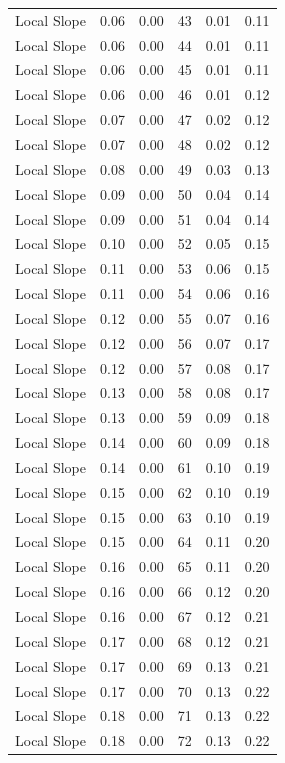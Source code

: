 \documentclass[
]{article}
\begin{document}
\begin{longtable}[]{@{}lrrrrr@{}}
Local Slope & 0.06 & 0.00 & 43 & 0.01 & 0.11 \\
Local Slope & 0.06 & 0.00 & 44 & 0.01 & 0.11 \\
Local Slope & 0.06 & 0.00 & 45 & 0.01 & 0.11 \\
Local Slope & 0.06 & 0.00 & 46 & 0.01 & 0.12 \\
Local Slope & 0.07 & 0.00 & 47 & 0.02 & 0.12 \\
Local Slope & 0.07 & 0.00 & 48 & 0.02 & 0.12 \\
Local Slope & 0.08 & 0.00 & 49 & 0.03 & 0.13 \\
Local Slope & 0.09 & 0.00 & 50 & 0.04 & 0.14 \\
Local Slope & 0.09 & 0.00 & 51 & 0.04 & 0.14 \\
Local Slope & 0.10 & 0.00 & 52 & 0.05 & 0.15 \\
Local Slope & 0.11 & 0.00 & 53 & 0.06 & 0.15 \\
Local Slope & 0.11 & 0.00 & 54 & 0.06 & 0.16 \\
Local Slope & 0.12 & 0.00 & 55 & 0.07 & 0.16 \\
Local Slope & 0.12 & 0.00 & 56 & 0.07 & 0.17 \\
Local Slope & 0.12 & 0.00 & 57 & 0.08 & 0.17 \\
Local Slope & 0.13 & 0.00 & 58 & 0.08 & 0.17 \\
Local Slope & 0.13 & 0.00 & 59 & 0.09 & 0.18 \\
Local Slope & 0.14 & 0.00 & 60 & 0.09 & 0.18 \\
Local Slope & 0.14 & 0.00 & 61 & 0.10 & 0.19 \\
Local Slope & 0.15 & 0.00 & 62 & 0.10 & 0.19 \\
Local Slope & 0.15 & 0.00 & 63 & 0.10 & 0.19 \\
Local Slope & 0.15 & 0.00 & 64 & 0.11 & 0.20 \\
Local Slope & 0.16 & 0.00 & 65 & 0.11 & 0.20 \\
Local Slope & 0.16 & 0.00 & 66 & 0.12 & 0.20 \\
Local Slope & 0.16 & 0.00 & 67 & 0.12 & 0.21 \\
Local Slope & 0.17 & 0.00 & 68 & 0.12 & 0.21 \\
Local Slope & 0.17 & 0.00 & 69 & 0.13 & 0.21 \\
Local Slope & 0.17 & 0.00 & 70 & 0.13 & 0.22 \\
Local Slope & 0.18 & 0.00 & 71 & 0.13 & 0.22 \\
Local Slope & 0.18 & 0.00 & 72 & 0.13 & 0.22 \\

\end{longtable}
\end{document}
